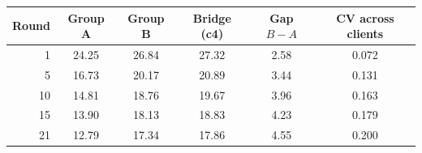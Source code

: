 \begin{tabular}{r ccc c c}
\toprule
Round & Group A & Group B & Bridge (c4) & Gap $B{-}A$ & CV across clients\\
\midrule
1 & 24.25 & 26.84 & 27.32 & 2.58 & 0.072\\
5 & 16.73 & 20.17 & 20.89 & 3.44 & 0.131\\
10 & 14.81 & 18.76 & 19.67 & 3.96 & 0.163\\
15 & 13.90 & 18.13 & 18.83 & 4.23 & 0.179\\
21 & 12.79 & 17.34 & 17.86 & 4.55 & 0.200\\
\bottomrule
\end{tabular}
